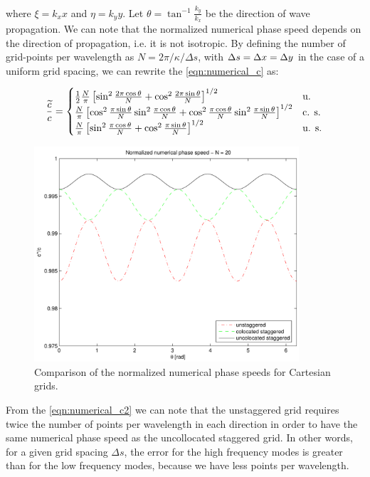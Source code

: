 where $\xi = k_x x$ and $\eta = k_y y$. Let $\theta = \tan^{-1}
\frac{k_y}{k_x}$ be the direction of wave propagation. We can note
that the normalized numerical phase speed depends on the direction of
propagation, i.e. it is not isotropic. By defining the number of
grid-points per wavelength as $N = 2\pi/\kappa / \Delta s$, with
$\Delta s = \Delta x = \Delta y$ in the case of a uniform grid spacing,
we can rewrite the \eqref{eqn:numerical_c} as:

\begin{equation} \label{eqn:numerical_c2}
\frac{\widetilde{c}}{c} = \begin{cases}
  \frac{1}{2}\frac{N}{\pi}\left[ \sin^2 \frac{2\pi \cos \theta}{N} + \cos^2
  \frac{2\pi \sin \theta}{N} \right]^{1/2} & \text{u.} \\
  \frac{N}{\pi}\left[ \cos^2 \frac{\pi \sin \theta}{N} \sin^2
  \frac{\pi \cos \theta}{N} + \cos^2 \frac{\pi \cos \theta}{N} \sin^2
  \frac{\pi \sin \theta}{N} \right]^{1/2} &
  \text{c. s.} \\
  \frac{N}{\pi} \left[ \sin^2 \frac{\pi \cos \theta}{N} + \cos^2
  \frac{\pi \sin \theta}{N} \right]^{1/2} &
  \text{u. s.}
  \end{cases}
\end{equation}

\begin{figure}[htbp]
  \begin{center}
    \includegraphics[height=8cm]{pics/liu_fourier_fig3}
  \end{center}
  \caption{Comparison of the normalized numerical phase speeds for
  Cartesian grids.}
  \label{fig:numerical_c}
\end{figure}  

From the \eqref{eqn:numerical_c2} we can note that the unstaggered
grid requires twice the number of points per wavelength in each
direction in order to have the same numerical phase speed as the
uncollocated staggered grid. In other words, for a given grid spacing
$\Delta s$, the error for the high frequency modes is greater than for
the low frequency modes, because we have less points per wavelength.

